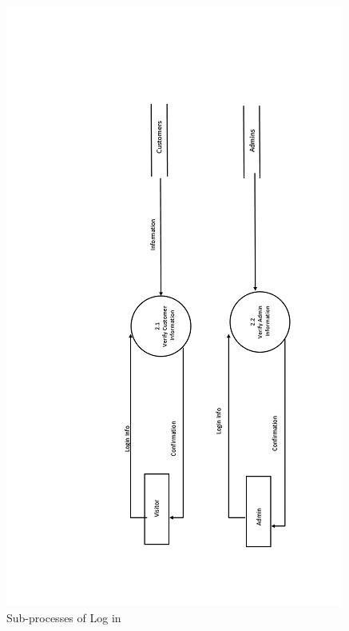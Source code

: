  \begin{figure}
 \centering
\includegraphics{figures/2final.png}
\caption{Sub-processes of Log in}
\end{figure}


